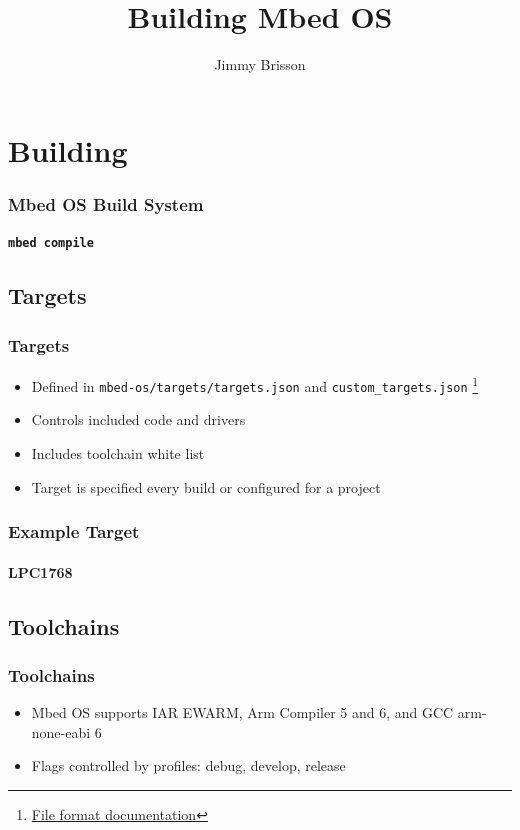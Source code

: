 \documentclass{beamer}
\title{Building Mbed OS}
\author{Jimmy Brisson}
\begin{document}
\frame{\titlepage}
\section{Building}
\begin{frame}
  \frametitle{Mbed OS Build System}
  \framesubtitle{\texttt{mbed compile}}
  \tableofcontents[currentsection]
\end{frame}
\subsection{Targets}
\begin{frame}
  \frametitle{Targets}
  \begin{itemize}
  \item Defined in \texttt{mbed-os/targets/targets.json} and \texttt{custom\_targets.json}
  \footnote{\href{https://os.mbed.com/docs/v5.6/tools/adding-and-configuring-targets.html}{File format documentation}}
  \item Controls included code and drivers
  \item Includes toolchain white list
  \item Target is specified every build or configured for a project
  \end{itemize}
\end{frame}
\begin{frame}[fragile]
  \frametitle{Example Target}
  \framesubtitle{LPC1768}
  
\end{frame}
\subsection{Toolchains}
\begin{frame}
  \frametitle{Toolchains}
  \begin{itemize}
    \item Mbed OS supports IAR EWARM, Arm Compiler 5 and 6, and GCC arm-none-eabi 6
    \item Flags controlled by profiles: debug, develop, release
  \end{itemize}
  
\end{frame}
\end{document}
